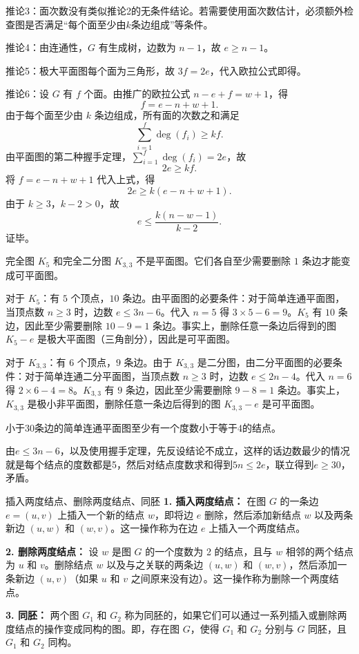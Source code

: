 推论3：面次数没有类似推论2的无条件结论。若需要使用面次数估计，必须额外检查图是否满足“每个面至少由$k$条边组成”等条件。

推论4：由连通性，$G$ 有生成树，边数为 $n-1$，故 $e \geqslant n-1$。

推论5：极大平面图每个面为三角形，故 $3f=2e$，代入欧拉公式即得。

推论6：设 $G$ 有 $f$ 个面。由推广的欧拉公式 $n - e + f = w + 1$，得
    \[
    f = e - n + w + 1.
    \]
    由于每个面至少由 $k$ 条边组成，所有面的次数之和满足
    \[
    \sum_{i=1}^{f} \deg(f_i) \ge k f.
    \]
    由平面图的第二种握手定理，$\sum_{i=1}^{f} \deg(f_i) = 2e$，故
    \[
    2e \ge k f.
    \]
    将 $f = e - n + w + 1$ 代入上式，得
    \[
    2e \ge k (e - n + w + 1).
    \]
    由于 $k \ge 3$，$k-2 > 0$，故
    \[
    e \le \frac{k(n - w - 1)}{k-2}.
    \]
    证毕。
\begin{example}{}{}
    完全图 $K_5$ 和完全二分图 $K_{3,3}$ 不是平面图。它们各自至少需要删除 $1$ 条边才能变成可平面图。
\end{example}
对于 $K_5$：有 $5$ 个顶点，$10$ 条边。由平面图的必要条件：对于简单连通平面图，当顶点数 $n \geqslant 3$ 时，边数 $e \leqslant 3n-6$。代入 $n=5$ 得 $3 \times 5 - 6 = 9$。$K_5$ 有 $10$ 条边，因此至少需要删除 $10-9=1$ 条边。事实上，删除任意一条边后得到的图 $K_5 - e$ 是极大平面图（三角剖分），因此是可平面图。

对于 $K_{3,3}$：有 $6$ 个顶点，$9$ 条边。由于 $K_{3,3}$ 是二分图，由二分平面图的必要条件：对于简单连通二分平面图，当顶点数 $n \geqslant 3$ 时，边数 $e \leqslant 2n-4$。代入 $n=6$ 得 $2 \times 6 - 4 = 8$。$K_{3,3}$ 有 $9$ 条边，因此至少需要删除 $9-8=1$ 条边。事实上，$K_{3,3}$ 是极小非平面图，删除任意一条边后得到的图 $K_{3,3} - e$ 是可平面图。

\begin{example}{}{}
    小于30条边的简单连通平面图至少有一个度数小于等于4的结点。
\end{example}
由$e\leqslant 3n-6$，以及使用握手定理，先反设结论不成立，这样的话边数最少的情况就是每个结点的度数都是5，然后对结点度数求和得到$5n\leqslant 2e$，联立得到$e\geqslant 30$，矛盾。

\begin{definition}{插入两度结点、删除两度结点、同胚}{}
\textbf{1. 插入两度结点：}
在图 $G$ 的一条边 $e = (u, v)$ 上插入一个新的结点 $w$，即将边 $e$ 删除，然后添加新结点 $w$ 以及两条新边 $(u, w)$ 和 $(w, v)$。这一操作称为在边 $e$ 上插入一个两度结点。

\textbf{2. 删除两度结点：}
设 $w$ 是图 $G$ 的一个度数为 2 的结点，且与 $w$ 相邻的两个结点为 $u$ 和 $v$。删除结点 $w$ 以及与之关联的两条边 $(u, w)$ 和 $(w, v)$，然后添加一条新边 $(u, v)$（如果 $u$ 和 $v$ 之间原来没有边）。这一操作称为删除一个两度结点。

\textbf{3. 同胚：}
两个图 $G_1$ 和 $G_2$ 称为同胚的，如果它们可以通过一系列插入或删除两度结点的操作变成同构的图。即，存在图 $G$，使得 $G_1$ 和 $G_2$ 分别与 $G$ 同胚，且 $G_1$ 和 $G_2$ 同构。
\end{definition}

